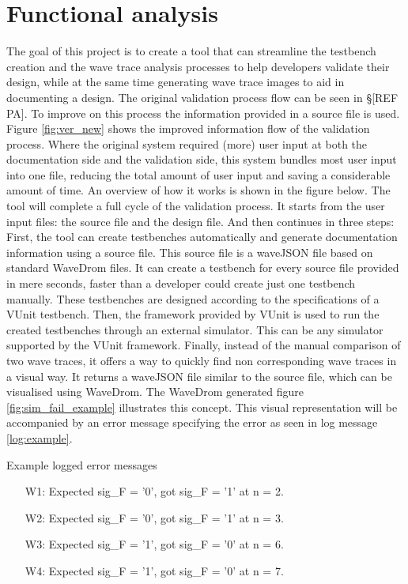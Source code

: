 \chapter{Functional analysis} \label{FA}
The goal of this project is to create a tool that can streamline the testbench creation and the wave trace analysis processes to help developers validate their design, while at the same time generating wave trace images to aid in documenting a design. The original validation process flow can be seen in §[REF PA]. To improve on this process the information provided in a source file is used. Figure \ref{fig:ver_new} shows the improved information flow of the validation process. Where the original system required (more) user input at both the documentation side and the validation side, this system bundles most user input into one file, reducing the total amount of user input and saving a considerable amount of time. An overview of how it works is shown in the figure below.\nline
{}\nline
The tool will complete a full cycle of the validation process. It starts from the user input files: the source file and the design file. And then continues in three steps:
\npar
First, the tool can create testbenches automatically and generate documentation information using a source file. This source file is a waveJSON file based on standard WaveDrom \cite{wavedrom} files. It can create a testbench for every source file provided in mere seconds, faster than a developer could create just one testbench manually. These testbenches are designed according to the specifications of a VUnit \cite{vunit} testbench.\newpage
\npar
Then, the framework provided by VUnit is used to run the created testbenches through an external simulator. This can be any simulator supported by the VUnit framework.
\npar
Finally, instead of the manual comparison of two wave traces, it offers a way to quickly find non corresponding wave traces in a visual way. It returns a waveJSON file similar to the source file, which can be visualised using WaveDrom. The WaveDrom generated figure \ref{fig:sim_fail_example} illustrates this concept. This visual representation will be accompanied by an error message specifying the error as seen in log message \cref{log:example}.\nline
{}\newpage
\begin{customenv}
	\caption{Example logged error messages}\label{log:example}
	\begin{itemize}
		\item [W1:] Expected sig\_F =  '0',  got sig\_F =  '1' at n = 2.
		\item [W2:] Expected sig\_F =  '0',  got sig\_F =  '1' at n = 3.
		\item [W3:] Expected sig\_F =  '1',  got sig\_F =  '0' at n = 6.
		\item [W4:] Expected sig\_F =  '1',  got sig\_F =  '0' at n = 7.
	\end{itemize}
\end{customenv}\newpage\noindent
